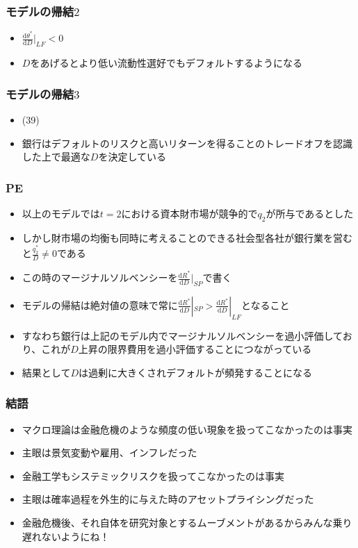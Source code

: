 \documentclass[dvipdfmx, 12pt]{beamer}
\begin{document}
\begin{frame}\frametitle{モデルの帰結$2$}
	\begin{itemize}
		\item $\frac{\mathrm{d}\theta^*}{\mathrm{d}D}|_{LF} < 0$
		\item $D$をあげるとより低い流動性選好でもデフォルトするようになる
	\end{itemize}
\end{frame}

\begin{frame}\frametitle{モデルの帰結$3$}
	\begin{itemize}
		\item (39)
		\item 銀行はデフォルトのリスクと高いリターンを得ることのトレードオフを認識した上で最適な$D$を決定している
	\end{itemize}
\end{frame}

\begin{frame}\frametitle{PE}
	\begin{itemize}
		\item 以上のモデルでは$t=2$における資本財市場が競争的で$q_2$が所与であるとした
		\item しかし財市場の均衡も同時に考えることのできる社会型各社が銀行業を営むと$\frac{q_2^*}{D} \neq 0$である
		\item この時のマージナルソルベンシーを$\frac{\mathrm{d}R^*}{\mathrm{d}D}|_{SP}$で書く
		\item モデルの帰結は絶対値の意味で常に$\frac{\mathrm{d}R^*}{\mathrm{d}D}|_{SP} > \frac{\mathrm{d}R^*}{\mathrm{d}D}|_{LF}$となること
		\item すなわち銀行は上記のモデル内でマージナルソルベンシーを過小評価しており、これが$D$上昇の限界費用を過小評価することにつながっている
		\item 結果として$D$は過剰に大きくされデフォルトが頻発することになる
	\end{itemize}
\end{frame}

\begin{frame}\frametitle{結語}
	\begin{itemize}
		\item マクロ理論は金融危機のような頻度の低い現象を扱ってこなかったのは事実
		\item 主眼は景気変動や雇用、インフレだった
		\item 金融工学もシステミックリスクを扱ってこなかったのは事実
		\item 主眼は確率過程を外生的に与えた時のアセットプライシングだった
		\item 金融危機後、それ自体を研究対象とするムーブメントがあるからみんな乗り遅れないようにね！
	\end{itemize}
\end{frame}
\end{document}

